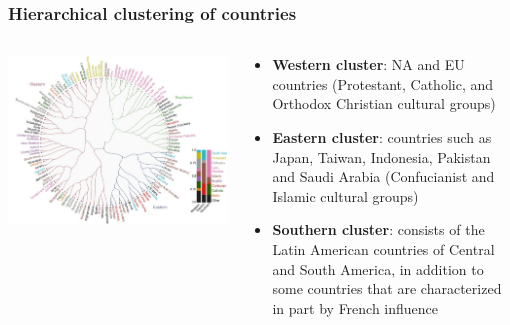 \documentclass[aspectratio=169]{beamer}
\begin{document}
\begin{frame}
    \frametitle{Hierarchical clustering of countries}
    \begin{columns}
        \begin{column}{0.6\linewidth}
            \includegraphics[width=1.0\linewidth]{assets/countries-mme.jpg}
        \end{column}
        \begin{column}{0.4\linewidth}
            \begin{itemize}
                \item \textbf{Western cluster}: NA and EU countries (Protestant, Catholic, and Orthodox Christian cultural groups)
                \item \textbf{Eastern cluster}: countries such as Japan, Taiwan, Indonesia, Pakistan and Saudi Arabia (Confucianist and Islamic cultural groups)
                \item \textbf{Southern cluster}: consists of the Latin American countries of Central and South America, in addition to some countries that are characterized in part by French influence
            \end{itemize}
        \end{column}
    \end{columns}
\end{frame}
\end{document}
